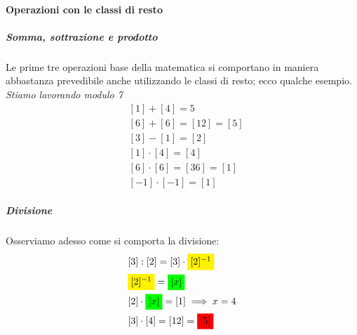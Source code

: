 \documentclass[12pt, a4paper,oneside]{report}
\begin{document}
	\paragraph{Operazioni con le classi di resto}
	\subparagraph{Somma, sottrazione e prodotto}
	Le prime tre operazioni base della matematica si comportano in maniera abbastanza prevedibile anche utilizzando le classi di resto; ecco qualche esempio.\\
	\textit{Stiamo lavorando \emph{modulo} 7}
	\begin{align*}
	&[1]+[4]=5\\
	&[6]+[6]=[12]=[5]\\
	&[3]-[1]=[2]\\
	&[1]\cdot[4]=[4]\\
	&[6]\cdot[6]=[36]=[1]\\
	&[-1]\cdot[-1]=[1]
	\end{align*}
	\subparagraph{Divisione}
	Osserviamo adesso come si comporta la divisione:
	\begin{align*}
	&[3]:[2]=[3]\cdot\colorbox{yellow}{$[2]^{-1}$}\\
	&\colorbox{yellow}{$[2]^{-1}$}=\colorbox{green}{$[x]$}\\
	&[2]\cdot\colorbox{green}{$[x]$}=[1]\implies x=4\\
	&[3]\cdot[4]=[12]=\colorbox{red}{$[5]$}
	\end{align*}
\end{document}
